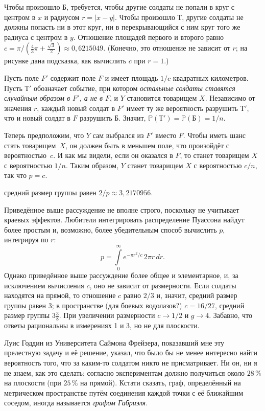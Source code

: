 \documentclass[twoside]{book}
\begin{document}
Чтобы произошло $\text{Б}$, требуется, чтобы другие солдаты не попали в круг с центром в $x$ и радиусом $r=|x-y|$.
Чтобы произошло $\text{Т}$, другие солдаты не должны попасть ни в этот круг, ни в перекрывающийся с ним круг того же радиуса с центром в $y$.
Отношение площадей первого и второго  равно $c=\pi/(\tfrac43\pi+\tfrac{\sqrt{3}}{2}) \approx 0{,}6215049$.
(Конечно, это отношение не зависит от $r$; на рисунке дана подсказка, как вычислить $c$ при $r=1$.)

Пусть поле $F'$ содержит поле $F$ и имеет площадь $1/c$ квадратных километров.
Пусть $\text{Т}'$ обозначает событие, при котором \emph{остальные солдаты ставятся случайным образом в $F'$, а не в $F$}, и $Y$ становится товарищем $X$.
Независимо от значения $r$, каждый новый солдат в $F'$ имеет ту же вероятность разрушить $\text{Т}'$, что и новый солдат в $F$ разрушить $\text{Б}$. 
Значит, $\mathbb{P}(\text{Т}')= \mathbb{P}(\text{Б}) = 1/n$.

Теперь предположим, что $Y$ сам выбрался из $F'$ вместо $F$.
Чтобы иметь шанс стать товарищем~$X$, он должен быть в меньшем поле, что произойдёт с вероятностью~$c$.
И как мы видели, если он оказался в $F$, то станет товарищем $X$ с вероятностью $1/n$.
Таким образом, $Y$ станет товарищем $X$ с вероятностью $c/n$, так что $p=c$.

 средний размер группы равен $2/p\approx3{,}2170956$.
\heart

Приведённое выше рассуждение не вполне строго, поскольку не учитывает краевых эффектов.
Любители интегрировать распределение Пуассона 
найдут более простым и, возможно, более убедительным способ вычислить $p$, интегрируя по $r$:
\[p=\int\limits_0^\infty e^{-\pi r^2/c}\,2\pi r\, dr.\]
Однако приведённое выше рассуждение более общее и элементарное, и, за исключением вычисления $c$, оно не зависит от размерности.
Если солдаты находятся на прямой, то отношение $c$ равно $2/3$ и, значит, средний размер группы равен 3;
в пространстве (для боевых водолазов?) $c = 16/27$,  средний размер группы  $3\tfrac38$.
При увеличении размерности $c\to 1/2$ и $g\to 4$. 
Забавно, что ответы рациональны в измерениях 1 и 3, но не для плоскости.

Луис Годдин из Университета Саймона Фрейзера, показавший мне эту прелестную задачу и её решение, указал, что было бы не менее интересно найти вероятность того, что за каким-то солдатом никто не присматривает.
Ни он, ни я не знаем, как это сделать;
согласно экспериментам должно получиться около $28\,\%$ на плоскости (при $25\,\%$ на прямой).
Кстати сказать, граф, определённый на метрическом пространстве путём соединения каждой точки с её ближайшим соседом, иногда называется \emph{графом Габриэля}.
\end{document}
